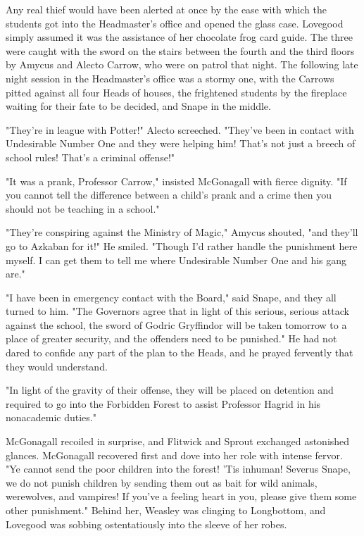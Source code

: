 \documentclass[a4paper,11pt]{article}
\begin{document}
Any real thief would have been alerted at once by the ease with which the students got into the Headmaster's office and opened the glass case. Lovegood simply assumed it was the assistance of her chocolate frog card guide. The three were caught with the sword on the stairs between the fourth and the third floors by Amycus and Alecto Carrow, who were on patrol that night. The following late night session in the Headmaster's office was a stormy one, with the Carrows pitted against all four Heads of houses, the frightened students by the fireplace waiting for their fate to be decided, and Snape in the middle.

"They're in league with Potter!" Alecto screeched. "They've been in contact with Undesirable Number One and they were helping him! That's not just a breech of school rules! That's a criminal offense!"

"It was a prank, Professor Carrow," insisted McGonagall with fierce dignity. "If you cannot tell the difference between a child's prank and a crime then you should not be teaching in a school."

"They're conspiring against the Ministry of Magic," Amycus shouted, "and they'll go to Azkaban for it!" He smiled. "Though I'd rather handle the punishment here myself. I can get them to tell me where Undesirable Number One and his gang are."

"I have been in emergency contact with the Board," said Snape, and they all turned to him. "The Governors agree that in light of this serious, serious attack against the school, the sword of Godric Gryffindor will be taken tomorrow to a place of greater security, and the offenders need to be punished." He had not dared to confide any part of the plan to the Heads, and he prayed fervently that they would understand.

"In light of the gravity of their offense, they will be placed on detention and required to go into the Forbidden Forest to assist Professor Hagrid in his nonacademic duties."

McGonagall recoiled in surprise, and Flitwick and Sprout exchanged astonished glances. McGonagall recovered first and dove into her role with intense fervor. "Ye cannot send the poor children into the forest! 'Tis inhuman! Severus Snape, we do not punish children by sending them out as bait for wild animals, werewolves, and vampires! If you've a feeling heart in you, please give them some other punishment." Behind her, Weasley was clinging to Longbottom, and Lovegood was sobbing ostentatiously into the sleeve of her robes.
\end{document}
